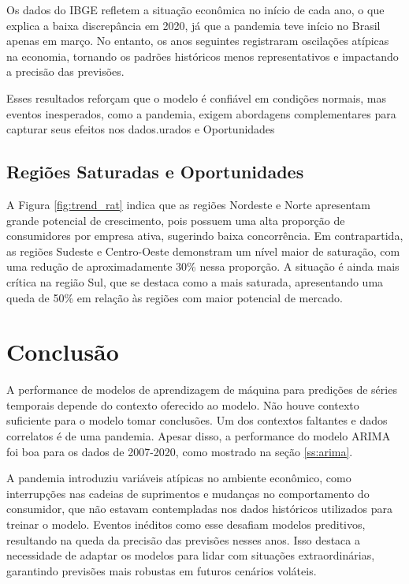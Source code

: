 \documentclass[12pt]{article}
\begin{document}
Os dados do IBGE refletem a situação econômica no início de cada ano, o que
explica a baixa discrepância em 2020, já que a pandemia teve início no
Brasil apenas em março. No entanto, os anos seguintes registraram
oscilações atípicas na economia, tornando os padrões históricos menos
representativos e impactando a precisão das previsões.

Esses resultados reforçam que o modelo é confiável em condições normais, mas
eventos inesperados, como a pandemia, exigem abordagens complementares para
capturar seus efeitos nos dados.urados e Oportunidades

\subsection{Regiões Saturadas e Oportunidades}

A Figura \ref{fig:trend_rat} indica que as regiões Nordeste e Norte apresentam
grande potencial de crescimento, pois possuem uma alta proporção de
consumidores por empresa ativa, sugerindo baixa concorrência. Em contrapartida,
as regiões Sudeste e Centro-Oeste demonstram um nível maior de saturação, com
uma redução de aproximadamente 30\% nessa proporção. A situação é ainda mais
crítica na região Sul, que se destaca como a mais saturada, apresentando uma
queda de 50\% em relação às regiões com maior potencial de mercado.

\section{Conclusão} 

A performance de modelos de aprendizagem de máquina para predições de séries temporais
depende do contexto oferecido ao modelo. Não houve contexto suficiente para o
modelo tomar conclusões. Um dos contextos faltantes e dados correlatos é de uma
pandemia. Apesar disso, a performance do modelo ARIMA foi boa para os dados de
2007-2020, como mostrado na seção \ref{ss:arima}.

A pandemia introduziu variáveis atípicas no ambiente econômico, como
interrupções nas cadeias de suprimentos e mudanças no comportamento do
consumidor, que não estavam contempladas nos dados históricos utilizados para
treinar o modelo. Eventos inéditos como esse desafiam modelos preditivos,
resultando na queda da precisão das previsões nesses anos. Isso
destaca a necessidade de adaptar os modelos para lidar com situações
extraordinárias, garantindo previsões mais robustas em futuros cenários
voláteis.
\end{document}
